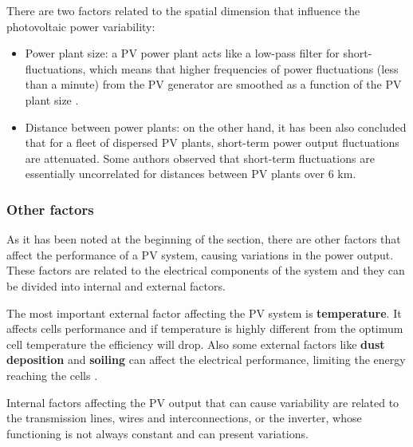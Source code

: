 There are two factors related to the spatial dimension that influence the photovoltaic power variability:

\begin{itemize}
\item Power plant size:
  a PV power plant acts like a low-pass filter for short-fluctuations, which means that higher frequencies of power fluctuations (less than a minute) from the PV generator are smoothed as a function of the PV plant size \cite*{Perpinan2011, Perpinan2013}.
\item Distance between power plants:
  on the other hand, it has been also concluded that for a fleet of dispersed PV plants, short-term power output fluctuations are attenuated. Some authors observed that short-term fluctuations are essentially uncorrelated for distances between PV plants over 6 km.\cite*{Otani1997, Wiemken2001, Hoff2012}
\end{itemize}


\subsubsection{Other factors}

As it has been noted at the beginning of the section, there are other factors that affect the performance of a PV system, causing variations in the power output. These factors are related to the electrical components of the system and they can be divided into internal and external factors.

The most important external factor affecting the PV system is \textbf{temperature}. It affects cells performance and if temperature is highly different from the optimum cell temperature the efficiency will drop. Also some external factors like \textbf{dust deposition} and \textbf{soiling} can affect the electrical performance, limiting the energy reaching the cells \cite*{Fan1986, Mekhilef2012,Dubey2013}.

Internal factors affecting the PV output that can cause variability are related to the transmission lines, wires and interconnections, or the inverter, whose functioning is not always constant and can present variations.


